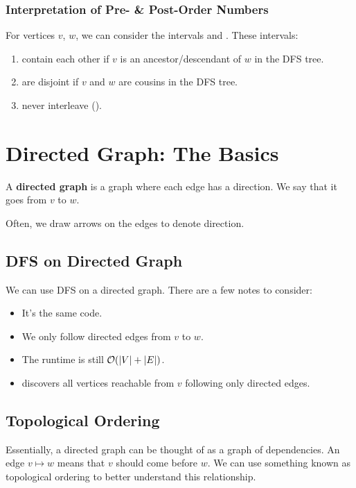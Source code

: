 \documentclass[letterpaper]{article}
\begin{document}
\subsubsection{Interpretation of Pre- \& Post-Order Numbers}
\begin{proposition}
    For vertices $v$, $w$, we can consider the intervals  and . These intervals:
    \begin{enumerate}
        \item contain each other if $v$ is an ancestor/descendant of $w$ in the DFS tree. 
        \item are disjoint if $v$ and $w$ are cousins in the DFS tree.
        \item never interleave ().
    \end{enumerate}
\end{proposition}


\newpage 
\section{Directed Graph: The Basics}
\begin{definition}{}{}
    A \textbf{directed graph} is a graph where each edge has a direction. We say that it goes from $v$ to $w$. 
\end{definition}
Often, we draw arrows on the edges to denote direction. 

\subsection{DFS on Directed Graph}
We can use DFS on a directed graph. There are a few notes to consider:
\begin{itemize}
    \item It's the same code. 
    \item We only follow directed edges from $v$ to $w$. 
    \item The runtime is still $\mathcal{O}(|V| + |E|)$. 
    \item {} discovers all vertices reachable from $v$ following only directed edges. 
\end{itemize}

\subsection{Topological Ordering}
Essentially, a directed graph can be thought of as a graph of dependencies. An edge $v \mapsto w$ means that $v$ should come before $w$. We can use something known as topological ordering to better understand this relationship.
\end{document}
